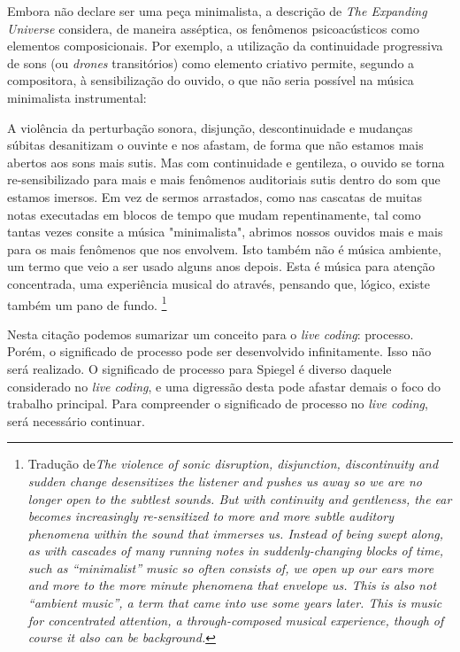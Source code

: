 Embora não declare ser uma peça minimalista, a descrição de \emph{The Expanding Universe} considera, de maneira asséptica, os fenômenos psicoacústicos como elementos composicionais. Por exemplo, a utilização da continuidade progressiva de sons (ou \emph{drones} transitórios) como elemento criativo permite, segundo a compositora, à sensibilização do ouvido, o que não seria possível na música minimalista instrumental:

\begin{citacao}
 A violência da perturbação sonora, disjunção, descontinuidade e mudanças súbitas desanitizam o ouvinte e nos afastam, de forma que não estamos mais abertos aos sons mais sutis. Mas com continuidade e gentileza, o ouvido se torna re-sensibilizado para mais e mais fenômenos auditoriais sutis dentro do som que estamos imersos. Em vez de sermos arrastados, como nas cascatas de muitas notas executadas em blocos de tempo que mudam repentinamente, tal como tantas vezes consite a música "minimalista", abrimos nossos ouvidos mais e mais para os mais fenômenos que nos envolvem. Isto também não é música ambiente, um termo que veio a ser usado alguns anos depois. Esta é música para atenção concentrada, uma experiência musical do através, pensando que, lógico, existe também um pano de fundo. \footnote{Tradução de\emph{The violence of sonic disruption, disjunction, discontinuity and sudden change desensitizes the listener and pushes us away so we are no longer open to the subtlest sounds. But with continuity and gentleness, the ear becomes increasingly re-sensitized to more and more subtle auditory phenomena within the sound that immerses us. Instead of being swept along, as with cascades of many running notes in suddenly-changing blocks of time, such as “minimalist” music so often consists of, we open up our ears more and more to the more minute phenomena that envelope us. This is also not “ambient music”, a term that came into use some years later. This is music for concentrated attention, a through-composed musical experience, though of course it also can be background.}}
\end{citacao}

Nesta citação podemos sumarizar um conceito para o \emph{live coding}: processo. Porém, o significado de processo pode ser desenvolvido infinitamente. Isso não será realizado. O significado de processo para Spiegel é diverso daquele considerado no \emph{live coding}, e uma digressão desta pode afastar demais o foco do trabalho principal. Para compreender o significado de processo no \emph{live coding}, será necessário continuar.

